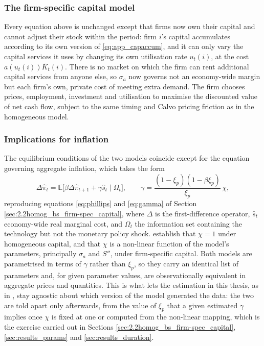 \documentclass[12pt, a4paper]{article}
\begin{document}
\begin{appendices}
\subsubsection*{The firm-specific capital model}

Every equation above is unchanged except that firms now own their capital and cannot adjust
their stock within the period: firm $i$'s capital accumulates according to its own version of
\eqref{eq:app_capaccum}, and it can only vary the capital services it uses by changing its own
utilisation rate $u_t(i)$, at the cost $a(u_t(i))\bar{K}_t(i)$. There is no market on which the
firm can rent additional capital services from anyone else, so $\sigma_a$ now governs not an
economy-wide margin but each firm's own, private cost of meeting extra demand. The firm chooses
prices, employment, investment and utilisation to maximise the discounted value of net cash flow,
subject to the same timing and Calvo pricing friction as in the homogeneous model.

\subsubsection*{Implications for inflation}

The equilibrium conditions of the two models coincide except for the equation governing
aggregate inflation, which takes the form
\begin{equation}
    \Delta \hat{\pi}_t = \mathbb{E}\bigl[\beta \Delta \hat{\pi}_{t+1} + \gamma \hat{s}_t \mid \Omega_t\bigr],
    \qquad
    \gamma = \frac{(1-\xi_p)(1-\beta\xi_p)}{\xi_p}\,\chi,
    \label{eq:app_phillips}
\end{equation}
reproducing equations \eqref{eq:phillips} and \eqref{eq:gamma} of Section
\ref{sec:2.2homog_bs_firm-spec_capital}, where $\Delta$ is the first-difference operator,
$\hat{s}_t$ economy-wide real marginal cost, and $\Omega_t$ the information set containing the
technology but not the monetary policy shock. \citet{ACEL2011} establish that $\chi = 1$ under
homogeneous capital, and that $\chi$ is a non-linear function of the model's parameters,
principally $\sigma_a$ and $S''$, under firm-specific capital. Both models are parametrised in
terms of $\gamma$ rather than $\xi_p$, so they carry an identical list of parameters and, for
given parameter values, are observationally equivalent in aggregate prices and quantities. This
is what lets the estimation in this thesis, as in \citet{ACEL2011}, stay agnostic about which
version of the model generated the data: the two are told apart only afterwards, from the value
of $\xi_p$ that a given estimated $\gamma$ implies once $\chi$ is fixed at one or computed from
the non-linear mapping, which is the exercise carried out in Sections
\ref{sec:2.2homog_bs_firm-spec_capital}, \ref{sec:results_params} and \ref{sec:results_duration}.


\end{appendices}
\end{document}
